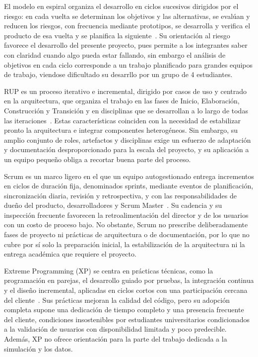 El modelo en espiral organiza el desarrollo en ciclos sucesivos dirigidos por el riesgo: en cada vuelta se determinan los objetivos y las alternativas, se evalúan y reducen los riesgos, con frecuencia mediante prototipos, se desarrolla y verifica el producto de esa vuelta y se planifica la siguiente~\cite{boehm1988spiral}. Su orientación al riesgo favorece el desarrollo del presente proyecto, pues permite a los integrantes saber con claridad cuando algo pueda estar fallando, sin embargo el análisis de objetivos en cada ciclo corresponde a un trabajo planificado para grandes equipos de trabajo, viendose dificultado su desarrllo por un grupo de 4 estudiantes.

RUP es un proceso iterativo e incremental, dirigido por casos de uso y centrado en la arquitectura, que organiza el trabajo en las fases de Inicio, Elaboración, Construcción y Transición y en disciplinas que se desarrollan a lo largo de todas las iteraciones~\cite{kruchten2003rup}. Estas características coinciden con la necesidad de estabilizar pronto la arquitectura e integrar componentes heterogéneos. Sin embargo, su amplio conjunto de roles, artefactos y disciplinas exige un esfuerzo de adaptación y documentación desproporcionado para la escala del proyecto, y su aplicación a un equipo pequeño obliga a recortar buena parte del proceso.

Scrum es un marco ligero en el que un equipo autogestionado entrega incrementos en ciclos de duración fija, denominados sprints, mediante eventos de planificación, sincronización diaria, revisión y retrospectiva, y con las responsabilidades de dueño del producto, desarrolladores y Scrum Master~\cite{scrumguide2020}. Su cadencia y su inspección frecuente favorecen la retroalimentación del director y de los usuarios con un costo de proceso bajo. No obstante, Scrum no prescribe deliberadamente fases de proyecto ni prácticas de arquitectura o de documentación, por lo que no cubre por sí solo la preparación inicial, la estabilización de la arquitectura ni la entrega académica que requiere el proyecto.

Extreme Programming (XP) se centra en prácticas técnicas, como la programación en parejas, el desarrollo guiado por pruebas, la integración continua y el diseño incremental, aplicadas en ciclos cortos con una participación cercana del cliente~\cite{beck2004xp}. Sus prácticas mejoran la calidad del código, pero su adopción completa supone una dedicación de tiempo completo y una presencia frecuente del cliente, condiciones insostenibles por estudiantes universitarios condicionados a la validación de usuarios con disponibilidad limitada y poco predecible. Además, XP no ofrece orientación para la parte del trabajo dedicada a la simulación y los datos.

